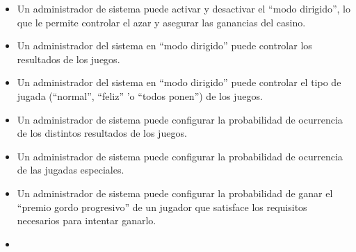 \begin{itemize}

\item {} 

 Un administrador de sistema puede activar y desactivar el ``modo dirigido'', lo que le permite controlar el azar y asegurar las ganancias del casino.

\item {} 

 Un administrador del sistema en ``modo dirigido'' puede controlar los resultados de los juegos.

\item {} 

 Un administrador del sistema en ``modo dirigido'' puede controlar el tipo de jugada (``normal'', ``feliz'' 'o ``todos ponen'') de los juegos.

\item {} 

 Un administrador de sistema puede configurar la probabilidad de ocurrencia de los distintos resultados de los juegos.

\item {} 

 Un administrador de sistema puede configurar la probabilidad de ocurrencia de las jugadas especiales.

\item {} 

 Un administrador de sistema puede configurar la probabilidad de ganar el ``premio gordo progresivo'' de un jugador que satisface los requisitos necesarios para intentar ganarlo.

\item {} 


\end{itemize}
